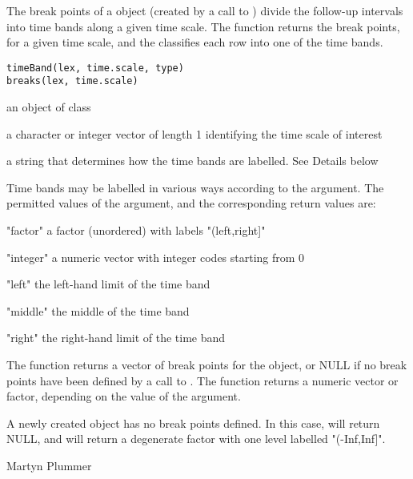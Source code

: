 \begin{Description}\relax
The break points of a  object (created by a call to
) divide the follow-up intervals into time bands
along a given time scale. The  function returns
the break points, for a given time scale, and the 
classifies each row into one of the time bands.
\end{Description}
\begin{Usage}
\begin{verbatim}
timeBand(lex, time.scale, type)
breaks(lex, time.scale)
\end{verbatim}
\end{Usage}
\begin{Arguments}
\begin{ldescription}
\item[\code{lex}] an object of class 
\item[\code{time.scale}] a character or integer vector of length 1
identifying the time scale of interest
\item[\code{type}] a string that determines how the time bands are labelled.
See Details below
\end{ldescription}
\end{Arguments}
\begin{Details}\relax
Time bands may be labelled in various ways according to the
 argument. The permitted values of the 
argument, and the corresponding return values are:
\item["factor"] a factor (unordered) with labels "(left,right]"
\item["integer"] a numeric vector with integer codes starting from 0
\item["left"] the left-hand limit of the time band
\item["middle"] the middle of the time band
\item["right"] the right-hand limit of the time band
\end{Details}
\begin{Value}
The  function returns a vector of break points
for the  object, or NULL if no break points have been
defined by a call to .  The 
function returns a numeric vector or factor, depending on the value
of the  argument.
\end{Value}
\begin{Note}\relax
A newly created  object has no break points defined.
In this case,  will return NULL, and
 will return a degenerate factor with one level
labelled "(-Inf,Inf]".
\end{Note}
\begin{Author}\relax
Martyn Plummer
\end{Author}
\begin{SeeAlso}\relax
{}
\end{SeeAlso}

